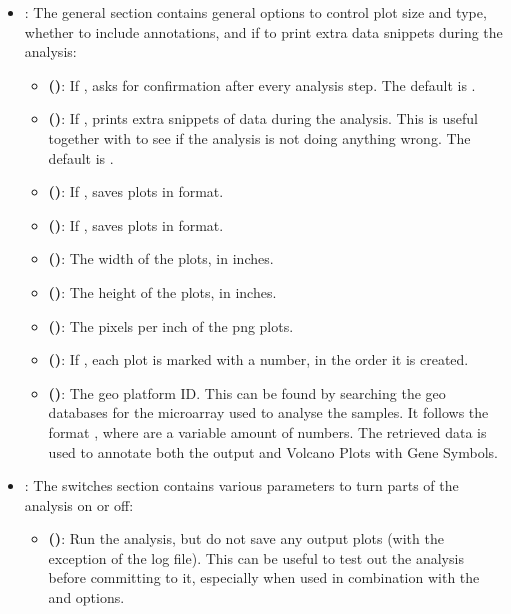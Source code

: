 \begin{itemize}
    \item \textbf{}: The general section contains general options to control plot size and type, whether to include annotations, and if to print extra data snippets during the analysis:
    \begin{itemize}
        \item \textbf{ ()}: If , asks for confirmation after every analysis step. The default is .
        \item \textbf{ ()}: If , prints extra snippets of data during the analysis. This is useful together with  to see if the analysis is not doing anything wrong. The default is .
        \item \textbf{ ()}: If , saves plots in  format.
        \item \textbf{ ()}: If , saves plots in  format.
        \item \textbf{ ()}: The width of the plots, in inches.
        \item \textbf{ ()}: The height of the plots, in inches.
        \item \textbf{ ()}: The pixels per inch of the png plots.
        \item \textbf{ ()}: If , each plot is marked with a number, in the order it is created.
        \item \textbf{ ()}: The \gls{geo} platform ID. This can be found by searching the \gls{geo} databases for the microarray used to analyse the samples. It follows the format , where  are a variable amount of numbers. The retrieved data is used to annotate both the output and Volcano Plots with Gene Symbols.
    \end{itemize}
    \item \textbf{}: The switches section contains various parameters to turn parts of the analysis on or off:
    \begin{itemize}
        \item \textbf{ ()}: Run the analysis, but do not save any output plots (with the exception of the log file). This can be useful to test out the analysis before committing to it, especially when used in combination with the  and  options.

\end{itemize}
\end{itemize}
